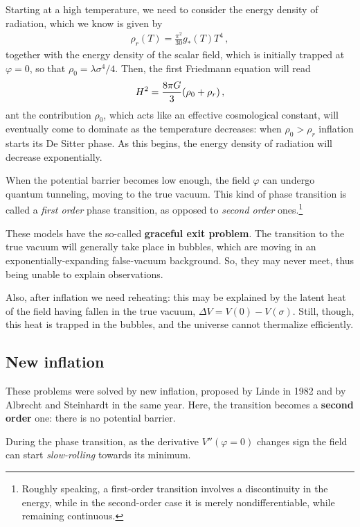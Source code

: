 \documentclass[main.tex]{subfiles}
\begin{document}
Starting at a high temperature, we need to consider the energy density of radiation, which we know is given by 
%
\begin{align}
\rho _r (T) = \frac{ \pi^2}{30 } g_* (T) T^{4}
\,,
\end{align}
%
together with the energy density of the scalar field, which is initially trapped at \(\varphi = 0\), so that \(\rho_0 = \lambda \sigma^{4} /4\). 
Then, the first Friedmann equation will read 
%
\begin{align}
H^2= \frac{8 \pi G}{3} \qty(\rho_0 + \rho _r)
\,,
\end{align}
%
ant the contribution \(\rho_0 \), which acts like an effective cosmological constant, will eventually come to dominate as the temperature decreases: when \(\rho_0 > \rho_r\) inflation starts its De Sitter phase. 
As this begins, the energy density of radiation will decrease exponentially. 

When the potential barrier becomes low enough, the field \(\varphi \) can undergo quantum tunneling, moving to the true vacuum. 
This kind of phase transition is called a \emph{first order} phase transition, as opposed to \emph{second order} ones.\footnote{Roughly speaking, a first-order transition involves a discontinuity in the energy, while in the second-order case it is merely nondifferentiable, while remaining continuous.}

These models have the so-called \textbf{graceful exit problem}.  
The transition to the true vacuum will generally take place in bubbles, which are moving in an exponentially-expanding false-vacuum background. 
So, they may never meet, thus being unable to explain observations. 

Also, after inflation we need reheating: this may be explained by the latent heat of the field having fallen in the true vacuum, \(\Delta V = V(0 ) - V(\sigma )\). 
Still, though, this heat is trapped in the bubbles, and the universe cannot thermalize efficiently.

\subsection{New inflation}

These problems were solved by new inflation, proposed by Linde in 1982 and by Albrecht and Steinhardt in the same year.
Here, the transition becomes a \textbf{second order} one: there is no potential barrier. 

During the phase transition, as the derivative \(V'' (\varphi =0)\) changes sign the field can start \emph{slow-rolling} towards its minimum. 
\end{document}
